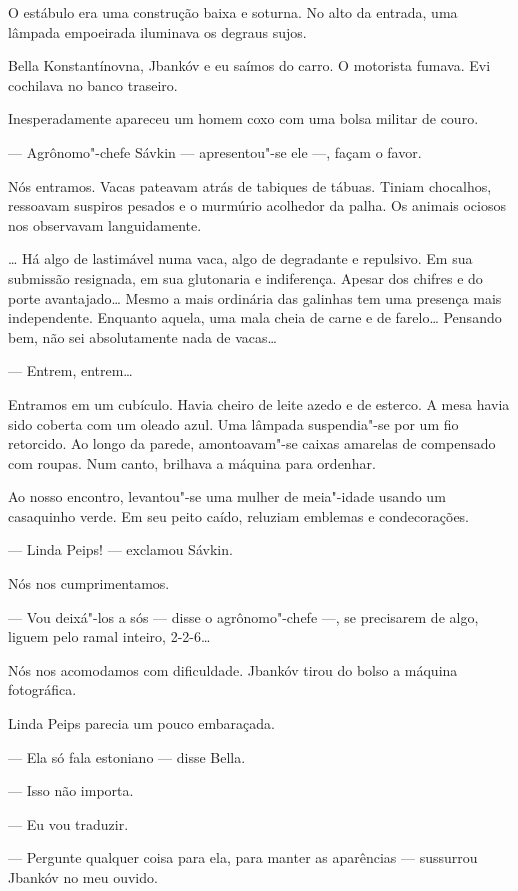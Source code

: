 O estábulo era uma construção baixa e soturna. No alto da entrada, uma
lâmpada empoeirada iluminava os degraus sujos.

Bella Konstantínovna, Jbankóv e eu saímos do carro. O motorista fumava.
Evi cochilava no banco traseiro.

Inesperadamente apareceu um homem coxo com uma bolsa militar de couro.

--- Agrônomo"-chefe Sávkin --- apresentou"-se ele ---, façam o favor.

Nós entramos. Vacas pateavam atrás de tabiques de tábuas. Tiniam
chocalhos, ressoavam suspiros pesados e o murmúrio acolhedor da palha.
Os animais ociosos nos observavam languidamente.

\ldots{} Há algo de lastimável numa vaca, algo de degradante e repulsivo. Em
sua submissão resignada, em sua glutonaria e indiferença. Apesar dos
chifres e do porte avantajado\ldots{} Mesmo a mais ordinária das galinhas tem
uma presença mais independente. Enquanto aquela, uma mala cheia de carne
e de farelo\ldots{} Pensando bem, não sei absolutamente nada de vacas\ldots{}

--- Entrem, entrem\ldots{}

Entramos em um cubículo. Havia cheiro de leite azedo e de esterco. A
mesa havia sido coberta com um oleado azul. Uma lâmpada suspendia"-se por
um fio retorcido. Ao longo da parede, amontoavam"-se caixas amarelas de
compensado com roupas. Num canto, brilhava a máquina para ordenhar.

Ao nosso encontro, levantou"-se uma mulher de meia"-idade usando um
casaquinho verde. Em seu peito caído, reluziam emblemas e condecorações.

--- Linda Peips! --- exclamou Sávkin.

Nós nos cumprimentamos.

--- Vou deixá"-los a sós --- disse o agrônomo"-chefe
---, se precisarem de algo, liguem pelo ramal inteiro, 2-2-6\ldots{}

Nós nos acomodamos com dificuldade. Jbankóv tirou do bolso a máquina
fotográfica.

Linda Peips parecia um pouco embaraçada.

--- Ela só fala estoniano --- disse Bella.

--- Isso não importa.

--- Eu vou traduzir.

--- Pergunte qualquer coisa para ela, para manter as aparências
--- sussurrou Jbankóv no meu ouvido.

